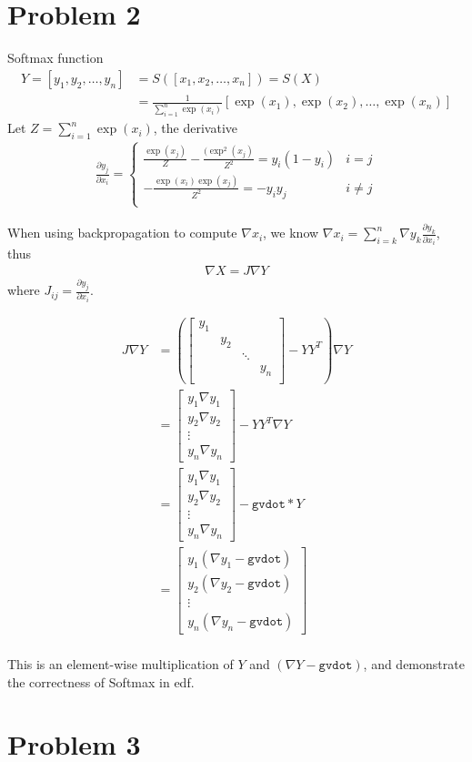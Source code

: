 \documentclass{article}
\begin{document}
\section*{Problem 2}
Softmax function
\begin{align*}
Y = [y_1,y_2,\ldots,y_n] &= S([x_1,x_2,\ldots,x_n]) = S(X)\\
&= \frac{1}{\sum_{i=1}^n
\exp(x_i)}[\exp(x_1),\exp(x_2),\ldots,\exp(x_n)]
\end{align*}
Let $Z = \sum_{i=1}^n\exp(x_i)$, the derivative
\begin{align*}
\frac{\partial y_j}{\partial x_i} =
\left\{
\begin{array}{cc}
\frac{\exp(x_j)}{Z}-\frac{(\exp^2(x_j)}{Z^2} = y_i(1-y_i) & i = j \\
-\frac{\exp(x_i)\exp(x_j)}{Z^2} = -y_iy_j & i \neq j \\
\end{array}
\right.
\end{align*}

When using backpropagation to compute $\nabla x_i$, we know $\nabla x_i =
\sum_{i=k}^n \nabla y_k \frac{\partial y_k}{\partial x_i}$, thus
\begin{align*}
\nabla X = J\nabla Y
\end{align*}
where $J_{ij} = \frac{\partial y_j}{\partial x_i}$.

\begin{align*}
J\nabla Y &= \left(\left[ 
\begin{array}{cccc}
y_1 & & & \\
 &y_2 & &\\
& & \ddots & \\
& & & y_n\\
\end{array}
\right] - YY^T\right)\nabla Y \\
&= \left[\begin{array}{c}y_1\nabla y_1\\y_2\nabla
y_2\\\vdots\\y_n\nabla y_n\end{array}\right] - YY^T\nabla Y\\
&= \left[\begin{array}{c}y_1\nabla y_1\\y_2\nabla
y_2\\\vdots\\y_n\nabla y_n\end{array}\right] - \texttt{gvdot}*Y\\
&=\left[\begin{array}{c}y_1(\nabla y_1 - \texttt{gvdot})\\y_2(\nabla
y_2-\texttt{gvdot})\\\vdots\\y_n(\nabla
y_n-\texttt{gvdot})\end{array}\right]\\
\end{align*}

This is an element-wise multiplication of $Y$ and $(\nabla Y - \texttt{gvdot})$,
and demonstrate the correctness of Softmax in edf.

\section*{Problem 3}
\end{document}

